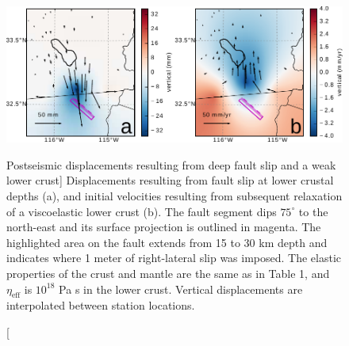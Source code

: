 \begin{figure}
\includegraphics[scale=1.0]{ch3/figures/2016jb013114-p09}
\caption
[Postseismic displacements resulting from deep fault slip and a weak
lower crust]
{Displacements resulting from fault slip at lower crustal
depths (a), and initial velocities resulting from subsequent
relaxation of a viscoelastic lower crust (b).  The fault segment dips
$75^\circ$ to the north-east and its surface projection is outlined in
magenta.  The highlighted area on the fault extends from 15 to 30 km
depth and indicates where 1 meter of right-lateral slip was imposed.
The elastic properties of the crust and mantle are the same as in
Table 1, and $\eta_\mathrm{eff}$ is $10^{18}$ Pa s in the lower crust.
Vertical displacements are interpolated between station locations.}
\label{ch3:fig:LowerCrust} 
\end{figure}
 

